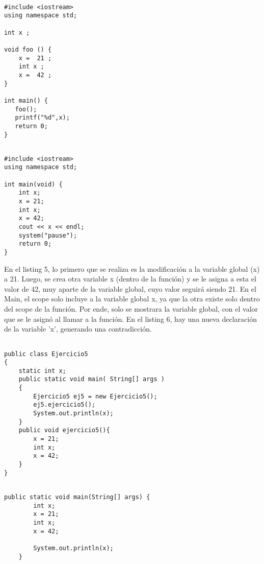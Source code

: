 \begin{lstlisting}[caption= Pregunta 5 Capítulo 5, label=amb, frame=single]  % Start your code-block
  
#include <iostream>
using namespace std;

int x ;

void foo () { 
    x =  21 ; 
    int x ; 
    x =  42 ;   
}

int main() {
   foo();
   printf("%d",x);
   return 0;
}
\end{lstlisting}

\begin{lstlisting}[caption= Pregunta 5 Capítulo 5, label=amb, frame=single]  % Start your code-block
  
#include <iostream>
using namespace std;

int main(void) {
	int x;
	x = 21;
	int x;
	x = 42;
	cout << x << endl;
	system("pause");
	return 0;
}
\end{lstlisting}

En el listing 5, lo primero que se realiza es la modificación a la variable global (x) a 21. Luego, se crea otra variable x (dentro de la función) y se le asigna a esta el valor de 42, muy aparte de la variable global, cuyo valor seguirá siendo 21. En el Main, el scope solo incluye a la variable global x, ya que la otra existe solo dentro del scope de la función. Por ende, solo se mostrara la variable global, con el valor que se le asignó al llamar a la función.
En el listing 6, hay una nueva declaración de la variable 'x', generando una contradicción.

\lstset{language=Java}          %

\begin{lstlisting}[caption= Pregunta 5 Capítulo 5, label=amb, frame=single]  % Start your code-block
  
public class Ejercicio5
{
    static int x;
    public static void main( String[] args )
    {
        Ejercicio5 ej5 = new Ejercicio5();
        ej5.ejercicio5();
        System.out.println(x);
    }
    public void ejercicio5(){
        x = 21;
        int x;
        x = 42;
    }
}
\end{lstlisting}

\begin{lstlisting}[caption= Pregunta 5 Capítulo 5, label=amb, frame=single]  % Start your code-block
  
public static void main(String[] args) {
        int x;
        x = 21;
        int x;
        x = 42;
        
        System.out.println(x);
    }
\end{lstlisting}
